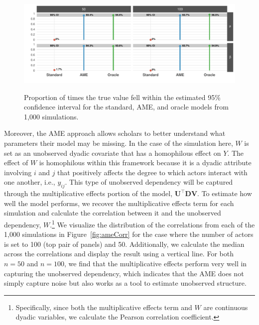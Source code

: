 \begin{figure}
	\centering
	\caption{Proportion of times the true value fell within the estimated 95\% confidence interval for the standard, AME, and oracle models from 1,000 simulations.}
	\label{fig:ameCalib}
	\includegraphics[width=1\textwidth]{graphics/ameSimCover_all.pdf} \\
\end{figure}

Moreover, the AME approach allows scholars to better understand what parameters their model may be missing. In the case of the simulation here, $W$ is set as an unobserved dyadic covariate that has a homophilous effect on $Y$. The effect of $W$ is homophilous within this framework because it is a dyadic attribute involving $i$ and $j$ that positively affects the degree to which actors interact with one another, i.e., $y_{ij}$. This type of unobserved dependency will be captured through the multiplicative effects portion of the model, $\mathbf{U}^{\top} \mathbf{D} \mathbf{V}$. To estimate how well the model performs, we recover the multiplicative effects term for each simulation and calculate the correlation between it and the unobserved dependency, $W$.\footnote{Specifically, since both the multiplicative effects term and $W$ are continuous dyadic variables, we calculate the Pearson correlation coefficient.} We visualize the distribution of the correlations from each of the 1,000 simulations in Figure~\ref{fig:ameCorr} for the case where the number of actors is set to 100 (top pair of panels) and 50. Additionally, we calculate the median across the correlations and display the result using a vertical line. For both $n=50$ and $n=100$, we find that the multiplicative effects perform very well in capturing the unobserved dependency, which indicates that the AME does not simply capture noise but also works as a tool to estimate unobserved structure.

